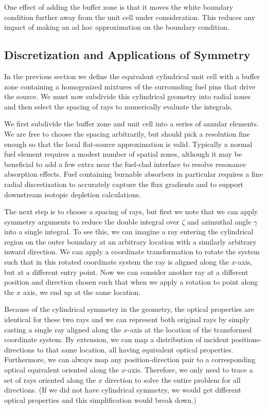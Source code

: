 One effect of adding the buffer zone is that it moves the white boundary condition further away from the unit cell under consideration. This reduces any impact of making an ad hoc approximation on the boundary condition.




\subsection{Discretization and Applications of Symmetry}

In the previous section we define the equivalent cylindrical unit cell with a buffer zone containing a homogenized mixtures of the surrounding fuel pins that drive the source. We must now subdivide this cylindrical geometry into radial zones and then select the spacing of rays to numerically evaluate the integrals. 

We first subdivide the buffer zone and unit cell into a series of annular elements. We are free to choose the spacing arbitrarily, but should pick a resolution fine enough so that the local flat-source approximation is valid. Typically a normal fuel element requires a modest number of spatial zones, although it may be beneficial to add a few extra near the fuel-clad interface to resolve resonance absorption effects. Fuel containing burnable absorbers in particular requires a fine radial discretization to accurately capture the flux gradients and to support downstream isotopic depletion calculations.

The next step is to choose a spacing of rays, but first we note that we can apply symmetry arguments to reduce the double integral over $\zeta$ and azimuthal angle $\gamma$ into a single integral. To see this, we can imagine a ray entering the cylindrical region on the outer boundary at an arbitrary location with a similarly arbitrary inward direction. We can apply a coordinate transformation to rotate the system such that in this rotated coordinate system the ray is aligned along the $x$-axis, but at a different entry point. Now we can consider another ray at a different position and direction chosen such that when we apply a rotation to point along the $x$ axis, we end up at the same location. 

Because of the cylindrical symmetry in the geometry, the optical properties are identical for these two rays and we can represent both original rays by simply casting a single ray aligned along the $x$-axis at the location of the transformed coordinate system. By extension, we can map a distribution of incident positions-directions to that same location, all having equivalent optical properties. Furthermore, we can always map any position-direction pair to a corresponding optical equivalent oriented along the $x$-axis. Therefore, we only need to trace a set of rays oriented along the $x$ direction to solve the entire problem for all directions. (If we did not have cylindrical symmetry, we would get different optical properties and this simplification would break down.)
 
